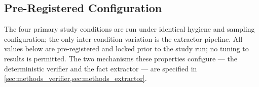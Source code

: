 \begin{table}[!htbp]
  \centering
  \caption{Nine conditions. Primary study conditions share identical
  hygiene (schema-gated verifier, query intervention, prompt-only
  abstention); they vary only in the extractor pipeline.}
  \label{tab:conditions}
\end{table}

\subsection{Pre-Registered Configuration}
\label{sec:methods_prereg}

The four primary study conditions are run under identical hygiene and
sampling configuration; the only inter-condition variation is the
extractor pipeline. All values below are pre-registered and locked
prior to the study run; no tuning to results is permitted. The two
mechanisms these properties configure --- the deterministic verifier
and the fact extractor --- are specified in
\cref{sec:methods_verifier,sec:methods_extractor}.

